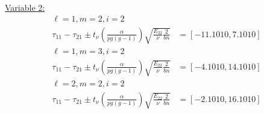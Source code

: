\begin{enumerate}[label= (\alph*)]
    \underline{Variable 2:}
    \begin{align*}
        \ell=1, m=2, i=2
        &
        \\
        \tau_{11} - \tau_{21} \pm t_{\nu} \left( \frac{\alpha}{pg(g-1)} \right) \sqrt{\frac{E_{22}}{\nu}\frac{2}{bn}}
        & = [-11.1010, 7.1010]
    \end{align*}
    \begin{align*}
        \ell=1, m=3, i=2
        &
        \\
        \tau_{11} - \tau_{21} \pm t_{\nu} \left( \frac{\alpha}{pg(g-1)} \right) \sqrt{\frac{E_{22}}{\nu}\frac{2}{bn}}
        & = [-4.1010, 14.1010]
    \end{align*}
    \begin{align*}
        \ell=2, m=2, i=2
        &
        \\
        \tau_{11} - \tau_{21} \pm t_{\nu} \left( \frac{\alpha}{pg(g-1)} \right) \sqrt{\frac{E_{22}}{\nu}\frac{2}{bn}}
        & = [-2.1010, 16.1010]
    \end{align*}
\end{enumerate}